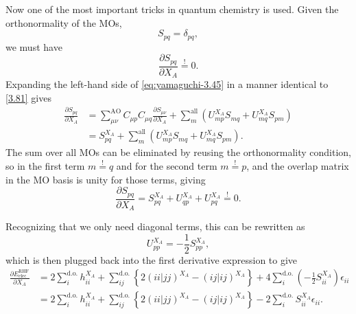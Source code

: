 \documentclass[%
class = book,%
crop = false,%
float = true,%
multi = true,%
preview = false,%
]{standalone}
\begin{document}
Now one of the most important tricks in quantum chemistry is used. Given the orthonormality of the MOs,
\begin{equation}
S_{pq} = \delta_{pq}, \tag{Yamaguchi eq. 3.44}
\end{equation}
we must have
\begin{equation}
  \label{eq:yamaguchi-3.45}\tag{Yamaguchi eq. 3.45}
  \frac{\partial S_{pq}}{\partial X_{A}} \overset{!}{=} 0.
\end{equation}
Expanding the left-hand side of \eqref{eq:yamaguchi-3.45} in a manner identical to \eqref{3.81} gives
\begin{align*}
\frac{\partial S_{pq}}{\partial X_{A}} &= \sum_{\mu\nu}^{\text{AO}} C_{\mu p} C_{\mu q} \frac{\partial S_{\mu\nu}}{\partial X_{A}} + \sum_{m}^{\text{all}} \left( U_{mp}^{X_{A}} S_{mq} + U_{mq}^{X_{A}} S_{pm} \right) \tag{Yamaguchi eqs. 3.40 + 3.43} \\
                                       &= S_{pq}^{X_{A}} + \sum_{m}^{\text{all}} \left( U_{mp}^{X_{A}} S_{mq} + U_{mq}^{X_{A}} S_{pm} \right). \tag{Yamaguchi eq. 3.43}
\end{align*}
The sum over all MOs can be eliminated by reusing the orthonormality condition, so in the first term \(m \overset{!}{=} q\) and for the second term \(m \overset{!}{=} p\), and the overlap matrix in the MO basis is unity for those terms, giving
\begin{equation}
  \label{eq:yamaguchi-3.46} \tag{Yamaguchi eq. 3.46}
  \frac{\partial S_{pq}}{\partial X_{A}} = S_{pq}^{X_{A}} + U_{qp}^{X_{A}} + U_{pq}^{X_{A}} \overset{!}{=} 0.
\end{equation}

Recognizing that we only need diagonal terms, this can be rewritten as
\begin{equation}
  \label{eq:yamaguchi-4.20} \tag{Yamaguchi eq. 4.20}
  U_{pp}^{X_{A}} = -\frac{1}{2} S_{pp}^{X_{A}},
\end{equation}
which is then plugged back into the first derivative expression to give
\begin{align*}
  \frac{\partial E_{\text{elec}}^{\text{RHF}}}{\partial X_{A}} &= 2 \sum_{i}^{\text{d.o.}} h_{ii}^{X_{A}} + \sum_{ij}^{\text{d.o.}} \left\{ 2(ii|jj)^{X_{A}} - (ij|ij)^{X_{A}} \right\} + 4 \sum_{i}^{\text{d.o.}} \left( -\frac{1}{2} S_{ii}^{X_{A}} \right) \epsilon_{ii} \\
                                                  &= 2 \sum_{i}^{\text{d.o.}} h_{ii}^{X_{A}} + \sum_{ij}^{\text{d.o.}} \left\{ 2(ii|jj)^{X_{A}} - (ij|ij)^{X_{A}} \right\} - 2 \sum_{i}^{\text{d.o.}} S_{ii}^{X_{A}} \epsilon_{ii}. \label{eq:yamaguchi-4.21-rederived}\tag{Yamaguchi eq. 4.21 [rederived]}
\end{align*}
\end{document}
